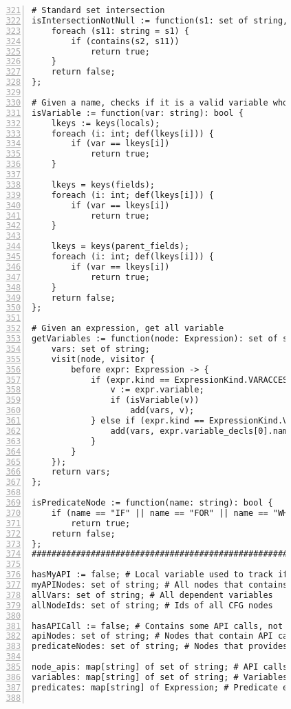 \begin{figure}[ht!]
\begin{lstlisting}[numbers=left, tabsize=4, escapechar=@, caption={API Usage Mining Analysis},label={lst:aun-code},  firstline = 321, firstnumber = 321, lastline = 381]
# Standard set intersection
isIntersectionNotNull := function(s1: set of string, s2: set of string): bool {
    foreach (s11: string = s1) {
        if (contains(s2, s11))
            return true;
    }
    return false;
};

# Given a name, checks if it is a valid variable whose type is available
isVariable := function(var: string): bool {
    lkeys := keys(locals);
    foreach (i: int; def(lkeys[i])) {
        if (var == lkeys[i])
            return true;
    }
    
    lkeys = keys(fields);
    foreach (i: int; def(lkeys[i])) {
        if (var == lkeys[i])
            return true;
    }
    
    lkeys = keys(parent_fields);
    foreach (i: int; def(lkeys[i])) {
        if (var == lkeys[i])
            return true;
    }
    return false;
};

# Given an expression, get all variable
getVariables := function(node: Expression): set of string {
    vars: set of string;
    visit(node, visitor {
        before expr: Expression -> {
            if (expr.kind == ExpressionKind.VARACCESS) {
                v := expr.variable;
                if (isVariable(v))
                    add(vars, v);
            } else if (expr.kind == ExpressionKind.VARDECL) {
                add(vars, expr.variable_decls[0].name);
            }
        }
    });
    return vars;
};

isPredicateNode := function(name: string): bool {
    if (name == "IF" || name == "FOR" || name == "WHILE")
        return true;
    return false;
};
#########################################################

hasMyAPI := false; # Local variable used to track if a node contains API method of interest
myAPINodes: set of string; # All nodes that contains API methods of interest
allVars: set of string; # All dependent variables
allNodeIds: set of string; # Ids of all CFG nodes

hasAPICall := false; # Contains some API calls, not necessarily API call of interest
apiNodes: set of string; # Nodes that contain API calls
predicateNodes: set of string; # Nodes that provides predicates

node_apis: map[string] of set of string; # API calls at nodes
variables: map[string] of set of string; # Variables at nodes
predicates: map[string] of Expression; # Predicate expressions at nodes


\end{lstlisting}
\end{figure}
